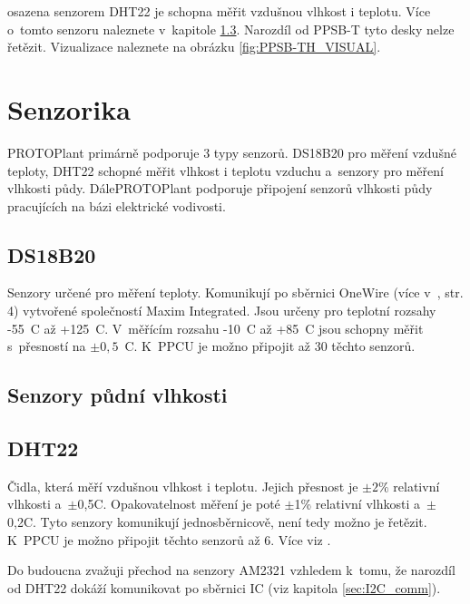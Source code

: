 \noindent{} osazena senzorem DHT22 \cite{DHT22} je schopna měřit vzdušnou vlhkost i teplotu.
Více o~tomto senzoru naleznete v~kapitole \ref{sec:DHT22}.
Narozdíl od PPSB-T tyto desky nelze řetězit.
Vizualizace naleznete na obrázku \ref{fig:PPSB-TH_VISUAL}.\newline

\section{Senzorika}
PROTOPlant primárně podporuje 3 typy senzorů. 
DS18B20 pro měření vzdušné teploty, DHT22 schopné měřit vlhkost i teplotu vzduchu a~senzory pro měření vlhkosti půdy.
DálePROTOPlant podporuje připojení senzorů vlhkosti půdy pracujících na bázi elektrické vodivosti.

\subsection{DS18B20}
\label{sec:DS18B20}
Senzory určené pro měření teploty. 
Komunikují po sběrnici OneWire (více v~\cite{DS18B20}, str. 4) vytvořené společností Maxim Integrated.
Jsou určeny pro teplotní rozsahy -55~\degree C až +125~\degree C.
V~měřícím rozsahu -10~\degree C až +85~\degree C jsou schopny měřit s~přesností na $\pm0,5$~\degree C.
K~PPCU je možno připojit až 30 těchto senzorů.


\subsection{Senzory půdní vlhkosti}

\subsection{DHT22}
\label{sec:DHT22}
Čidla, která měří vzdušnou vlhkost i teplotu.
Jejich přesnost je $\pm2\%$ relativní vlhkosti a~$\pm$0,5\degree C.
Opakovatelnost měření je poté $\pm$1\% relativní vlhkosti a~$\pm$0,2\degree C.
Tyto senzory komunikují jednosběrnicově, není tedy možno je řetězit.
K~PPCU je možno připojit těchto senzorů až 6.
Více viz \cite{DHT22}.

Do budoucna zvažuji přechod na senzory AM2321 \cite{AM2321} vzhledem k~tomu, že narozdíl od DHT22 dokáží komunikovat po sběrnici IC (viz kapitola \ref{sec:I2C_comm}).

\newpage